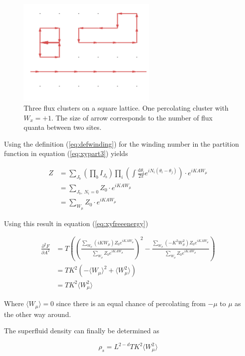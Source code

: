 \begin{figure}[h!]
    \centering
        \includegraphics[width=0.6\textwidth]{figures/percolatingFlux.png}
    \caption{Three flux clusters on a square lattice. One percolating cluster with $W_x = +1$. The size of arrow corresponds to the number of flux quanta between two sites.}
    \label{fig:fluxpercolation}
\end{figure}

Using the definition (\ref{eq:defwinding}) for the winding number in the partition function in equation (\ref{eq:xypart3}) yields

\begin{align}
    Z &= \sum_{J_b} \left ( \prod_b I_{J_b} \right ) \prod_i \left ( \int \frac{\mathrm d \theta_i}{2 \pi} e^{i N_i (\theta_i - \theta_j)} \right ) \cdot e^{i K A W_\mu} \\
    &= \sum_{J_b, \ N_i = 0} Z_0 \cdot e^{i K A W_\mu} \\
    &= \sum_{W_\mu} Z_0 \cdot e^{i K A W_\mu}
\end{align}

Using this result in equation (\ref{eq:xyfreeenergy})

\begin{align}
    \frac{\partial^2 F}{\partial A^2} &= T \left ( \left ( \frac{\sum_{W_\mu} (i K W_\mu) Z_0 e^{iKAW_\mu}}{\sum_{W_\mu} Z_0 e^{iKAW_\mu}} \right )^2 - \frac{\sum_{W_\mu} (- K^2 W_\mu^2) Z_0 e^{iKAW_\mu}}{\sum_{W_\mu} Z_0 e^{iKAW_\mu}} \right ) \\
%
    &= T K^2 \left ( -\langle W_\mu \rangle^2 + \langle W_\mu^2 \rangle \right ) \\
%
    &= T K^2 \langle W_\mu^2 \rangle
\end{align}

Where $\langle W_\mu \rangle = 0$ since there is an equal chance of percolating from $-\mu$ to $\mu$ as the other way around.

The superfluid density can finally be determined as

\begin{equation}
    \rho_s = L^{2 - d} T K^2 \langle W_\mu^2 \rangle 
\end{equation}

